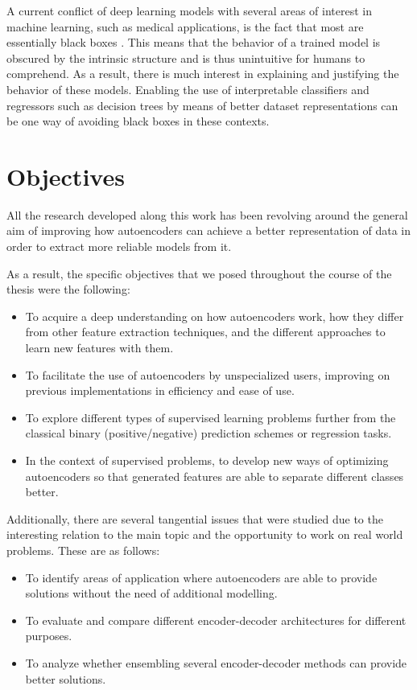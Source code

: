 
A current conflict of deep learning models with several areas of interest in machine learning, such as medical applications, is the fact that most are essentially black boxes . This means that the behavior of a trained model is obscured by the intrinsic structure and is thus unintuitive for humans to comprehend. As a result, there is much interest in explaining and justifying the behavior of these models. Enabling the use of interpretable classifiers and regressors such as decision trees by means of better dataset representations can be one way of avoiding black boxes in these contexts.

\section{Objectives}\label{sec:objectives}

All the research developed along this work has been revolving around the general aim of improving how autoencoders can achieve a better representation of data in order to extract more reliable models from it. 

As a result, the specific objectives that we posed throughout the course of the thesis were the following:

\begin{itemize}
    \item To acquire a deep understanding on how autoencoders work, how they differ from other feature extraction techniques, and the different approaches to learn new features with them.
    \item To facilitate the use of autoencoders by unspecialized users, improving on previous implementations in efficiency and ease of use.
    \item To explore different types of supervised learning problems further from the classical binary (positive/negative) prediction schemes or regression tasks.
    \item In the context of supervised problems, to develop new ways of optimizing autoencoders so that generated features are able to separate different classes better.
\end{itemize}

Additionally, there are several tangential issues that were studied due to the interesting relation to the main topic and the opportunity to work on real world problems. These are as follows:

\begin{itemize}
    \item To identify areas of application where autoencoders are able to provide solutions without the need of additional modelling.
    \item To evaluate and compare different encoder-decoder architectures for different purposes.
    \item To analyze whether ensembling several encoder-decoder methods can provide better solutions.
\end{itemize}

